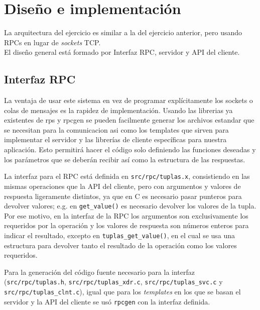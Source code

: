 \section{Diseño e implementación}

La arquitectura del ejercicio es similar a la del ejercicio anterior, pero usando RPCs en lugar de \textit{sockets} TCP.\\
El diseño general está formado por Interfaz RPC, servidor y API del cliente.


%     

\subsection{Interfaz RPC}
La ventaja de usar este sistema en vez de programar explícitamente los sockets o colas de mensajes es la rapidez de implementación. Usando las librerias ya existentes de rps y rpcgen se pueden facilmente generar los archivos estandar que se necesitan para la comunicacion asi como los templates que sirven para implementar el servidor y las librerías de cliente específicas para nuestra aplicación. Esto permitirá hacer el código solo definiendo las funciones deseadas y los parámetros que se deberán recibir así como la estructura de las respuestas.

La interfaz para el RPC está definida en \texttt{src/rpc/tuplas.x}, consistiendo en las mismas operaciones que la API del cliente, pero con argumentos y valores de respuesta ligeramente distintos, ya que en C es necesario pasar punteros para devolver valores; e.g. en \texttt{get\_value()} es necesario devolver los valores de la tupla.\\
Por ese motivo, en la interfaz de la RPC los argumentos son exclusivamente los requeridos por la operación y los valores de respuesta son números enteros para indicar el resultado, excepto en \texttt{tuplas\_get\_value()}, en el cual se usa una estructura para devolver tanto el resultado de la operación como los valores requeridos.\newline

Para la generación del código fuente necesario para la interfaz (\texttt{src/rpc/tuplas.h}, \texttt{src/rpc/tuplas\_xdr.c}, \texttt{src/rpc/tuplas\_svc.c} y \texttt{src/rpc/tuplas\_clnt.c}), igual que para los \textit{templates} en los que se basan el servidor y la API del cliente se usó \texttt{rpcgen} con la interfaz definida.

